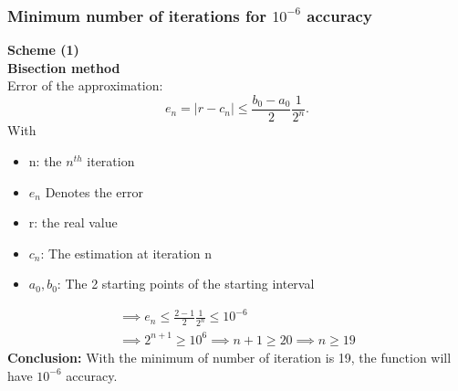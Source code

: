 \subsubsection{Minimum number of iterations for $10^{-6}$ accuracy}
\textbf{Scheme (1)}\\
\textbf{Bisection method} \\
Error of the approximation: 
\[
    e_{n} = |r - c_{n}| \le \frac{b_{0} - a_{0}}{2}\frac{1}{2^{n}}
.\] 
With
\begin{itemize}
    \item n: the $n^{th}$ iteration
    \item $e_{n}$ Denotes the error
    \item r: the real value
    \item  $c_{n}$: The estimation at iteration n
    \item  $a_{0}, b_{0}$: The 2 starting points of the starting interval
\end{itemize}

\begin{align*}
    \implies e_{n} \le \frac{2-1}{2} \frac{1}{2^{n}} \le 10^{-6} \\
    \implies 2^{n+1} \ge 10^{6}
    \implies n + 1 \ge 20
    \implies n \ge  19
\end{align*}
\textbf{Conclusion:} With the minimum of number of iteration is 19, the function will have $10^{-6}$ accuracy.




\newpage

